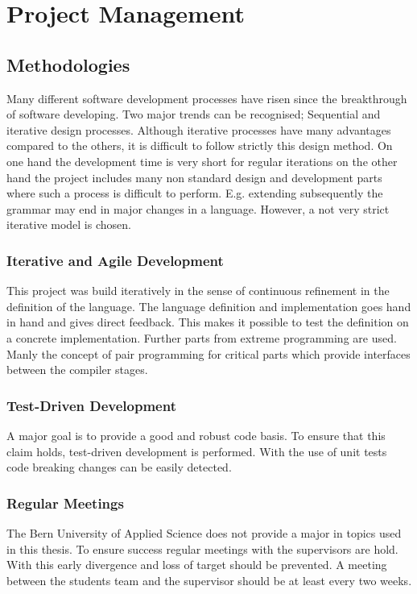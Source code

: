 \part{Project Management}
\chapter{Methodologies}
Many different software development processes have risen since the
breakthrough of software developing. Two major trends can be recognised;
Sequential and iterative design processes. Although iterative processes
have many advantages compared to the others, it is difficult to follow
strictly this design method. On one hand the development time is very
short for regular iterations on the other hand the project includes
many non standard design and development parts where such a process is
difficult to perform. E.g. extending subsequently the grammar may end
in major changes in a language. However, a not very strict iterative
model is chosen.

\section{Iterative and Agile Development}
This project was build iteratively in the sense of continuous
refinement in the definition of the language. The language definition and
implementation goes hand in hand and gives direct feedback. This makes it
possible to test the definition on a concrete implementation. Further
parts from extreme programming are used. Manly the concept of pair
programming for critical parts which provide interfaces between the
compiler stages.

\section{Test-Driven Development}
A major goal is to provide a good and robust code basis. To ensure that
this claim holds, test-driven development is performed. With the use of
unit tests code breaking changes can be easily detected.

\section{Regular Meetings}
The Bern University of Applied Science does not provide a major in
topics used in this thesis. To ensure success regular meetings with the
supervisors are hold. With this early divergence and loss of target should
be prevented. A meeting between the students team and the supervisor
should be at least every two weeks.


